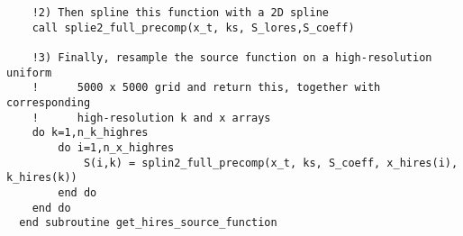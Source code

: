 \documentclass[a4paper]{report}
\begin{document}
\begin{verbatim}
    !2) Then spline this function with a 2D spline
    call splie2_full_precomp(x_t, ks, S_lores,S_coeff)

    !3) Finally, resample the source function on a high-resolution uniform
    !      5000 x 5000 grid and return this, together with corresponding
    !      high-resolution k and x arrays
    do k=1,n_k_highres
        do i=1,n_x_highres
            S(i,k) = splin2_full_precomp(x_t, ks, S_coeff, x_hires(i), k_hires(k))
        end do
    end do
  end subroutine get_hires_source_function

\end{verbatim}


\end{document}
